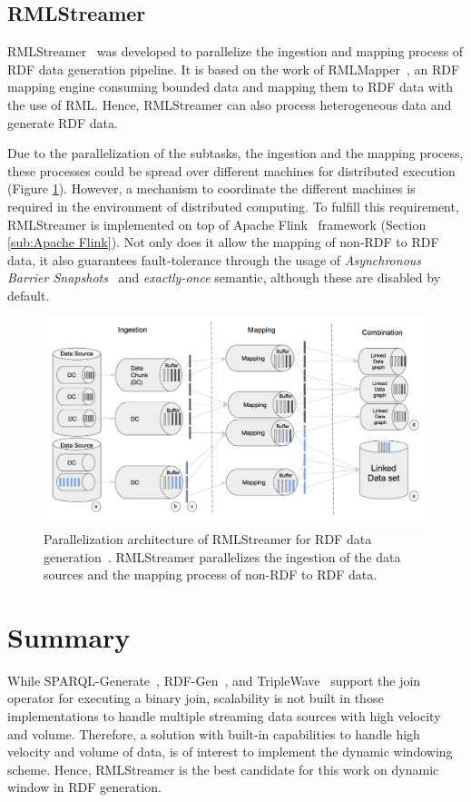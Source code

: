 \subsection{RMLStreamer}
\label{sec:rml_streamer}
RMLStreamer~\cite{rml_streamer}
was developed to parallelize the ingestion and mapping process of RDF data generation pipeline. 
It is based on the work of RMLMapper~\cite{rml}, an RDF mapping engine consuming bounded data and 
mapping them to RDF data with the use of RML. Hence, RMLStreamer can also 
process heterogeneous data and generate RDF data. 

Due to the parallelization of the subtasks, the ingestion and the mapping process, these processes
could be spread over different machines for distributed execution (Figure \ref{fig:rml-parallel-arch}). 
However, a mechanism to coordinate the different machines is required in the environment of 
distributed computing.  
To fulfill this requirement, RMLStreamer is 
implemented on top of Apache Flink~\cite{flink} framework (Section \ref{sub:Apache Flink}). Not only does it allow the mapping 
of non-RDF to RDF data, it also guarantees fault-tolerance through the usage of 
\emph{Asynchronous Barrier Snapshots}~\cite{flink_fault_tolerance} and \emph{exactly-once} semantic,
although these are disabled by default. 

\begin{figure}[!htbp]
  \centering
  \includegraphics[width=\textwidth]{fig/rml_streamer_arch.png}
  \caption{Parallelization architecture of RMLStreamer for RDF data generation~\cite{rml_streamer}. RMLStreamer parallelizes 
  the ingestion of the data sources and the mapping process of non-RDF to RDF data. }
  \label{fig:rml-parallel-arch}
\end{figure}


\section{Summary}
While SPARQL-Generate~\cite{sparql_generate}, RDF-Gen~\cite{rdf_gen}, and TripleWave~\cite{triple_wave} 
support the join operator for executing a binary join, scalability is not built in those implementations
to handle multiple streaming 
data sources with high velocity and volume. 
Therefore, a solution
with built-in capabilities to handle high velocity and volume of data, is of interest
to implement the dynamic windowing scheme. 
Hence, RMLStreamer is the best candidate for this work on dynamic window in RDF generation. 
